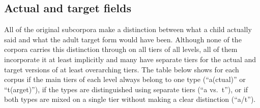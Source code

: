 \documentclass[a4paper, 11pt]{book}
\newcommand{\und}{\underline{{ }}\hspace{0.2mm}}	%
\begin{document}

\subsection{Actual and target fields}
\label{subsec:Actual and target fields}

All of the original subcorpora make a distinction between what a child actually said and what the adult target form would have been. Although none of the corpora carries this distinction through on all tiers of all levels, all of them incorporate it at least implicitly and many have separate tiers for the actual and target versions of at least overarching tiers. The table below shows for each corpus if the main tiers of each level always belong to one type (“a(ctual)” or “t(arget)”), if the types are distinguished using separate tiers (“a vs.\ t”), or if both types are mixed on a single tier without making a clear distinction (“a/t”).
\end{document}
